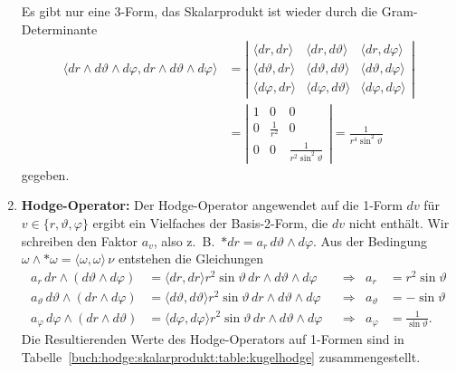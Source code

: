 \begin{enumerate}
Es gibt nur eine 3-Form, das Skalarprodukt ist wieder durch die 
Gram-Determinante
\begin{align*}
\langle
dr\wedge d\vartheta \wedge d\varphi,
dr\wedge d\vartheta \wedge d\varphi
\rangle
&=
\left|
\begin{matrix}
\langle dr, dr \rangle
&\langle dr, d\vartheta \rangle
&\langle dr, d\varphi \rangle
\\
\langle d\vartheta, dr \rangle
&\langle d\vartheta, d\vartheta \rangle
&\langle d\vartheta, d\varphi \rangle
\\
\langle d\varphi, dr \rangle
&\langle d\varphi, d\vartheta \rangle
&\langle d\varphi, d\varphi \rangle
\end{matrix}
\right|
\\
&=
\left|\begin{matrix}
1 & 0 & 0 \\
0 & \frac{1}{r^2} & 0 \\
0 & 0 & \frac{1}{r^2\sin^2\vartheta}
\end{matrix}\right|
=
\frac{1}{r^4\sin^2\vartheta}
\end{align*}
gegeben.
\item {\bf Hodge-Operator:}
Der Hodge-Operator angewendet auf die 1-Form $dv$ für
$v\in\{r,\vartheta,\varphi\}$  ergibt ein Vielfaches der Basis-2-Form,
die $dv$ nicht enthält.
Wir schreiben den Faktor $a_v$, also
z.~B.~$*dr = a_r\,d\vartheta\wedge d\varphi$.
Aus der Bedingung $\omega\wedge {\ast\omega}=\langle\omega,\omega\rangle\,\nu$
entstehen die Gleichungen
\begin{align*}
a_r\,
dr\wedge(d\vartheta\wedge d\varphi)
&=
\langle dr, dr\rangle
r^2\sin\vartheta\, dr\wedge d\vartheta\wedge d\varphi
&&\Rightarrow&
a_r &= r^2 \sin\vartheta
\\
a_\vartheta\,
d\vartheta \wedge(dr \wedge d\varphi)
&=
\langle d\vartheta,d\vartheta\rangle
r^2\sin\vartheta\,dr\wedge d\vartheta\wedge d\varphi
&&\Rightarrow&
a_\vartheta &= -\sin\vartheta
\\
a_\varphi\,
d\varphi \wedge(dr \wedge d\vartheta)
&=
\langle d\varphi,d\varphi\rangle
r^2\sin\vartheta\,dr\wedge d\vartheta\wedge d\varphi
&&\Rightarrow&
a_\varphi &= \frac{1}{\sin\vartheta}.
\end{align*}
Die Resultierenden Werte des Hodge-Operators auf 1-Formen sind in
Tabelle~\ref{buch:hodge:skalarprodukt:table:kugelhodge} zusammengestellt.


\end{enumerate}
